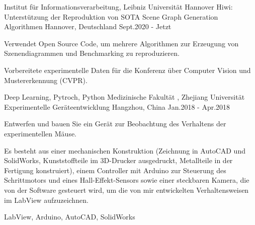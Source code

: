 

\begin{cventries}
  \cventry
  {Institut für Informationsverarbeitung, Leibniz Universität Hannover} %
  {Hiwi: Unterstützung der Reproduktion von SOTA Scene Graph Generation Algorithmen}
  {Hannover, Deutschland} %
  {Sept.2020 - Jetzt} %
  {
    \begin{cvitems} %
      \item {Verwendet Open Source Code, um mehrere Algorithmen zur Erzeugung von Szenendiagrammen und Benchmarking zu reproduzieren.}
      \item {Vorbereitete experimentelle Daten für die Konferenz über Computer Vision und Mustererkennung (CVPR).}
    \end{cvitems}
  }{Deep Learning, Pytroch, Python}
  \cventry
    {Medizinische Fakultät , Zhejiang Universität} %
    {Experimentelle Geräteentwicklung}
    {Hangzhou, China} %
    {Jan.2018 - Apr.2018} %
    {
      \begin{cvitems} %
        \item {Entwerfen und bauen Sie ein Gerät zur Beobachtung des Verhaltens der experimentellen Mäuse.}
        \item {Es besteht aus einer mechanischen Konstruktion (Zeichnung in AutoCAD und SolidWorks, Kunststoffteile im 3D-Drucker ausgedruckt, Metallteile in der Fertigung konstruiert), einem Controller mit Arduino zur Steuerung des Schrittmotors und eines Hall-Effekt-Sensors sowie einer steckbaren Kamera, die von der Software gesteuert wird, um die von mir entwickelten Verhaltensweisen im LabView aufzuzeichnen.}
      \end{cvitems}
    }{LabView, Arduino, AutoCAD, SolidWorks}

\end{cventries}
